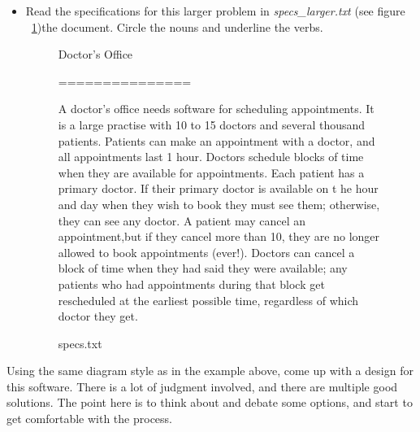 \documentclass[12pt]{article}
\begin{document}
\begin{itemize}
    \item Read the specifications for this larger problem in \textit{specs\_larger.txt}
    (see figure ~\ref{fig:specsText})the document. Circle the nouns and underline
    the verbs.

    \bigskip

    \begin{figure}
        \begin{mdframed}
            Doctor's Office

            ===============

            \bigskip

            A doctor's office needs software for scheduling appointments. It is a large
            practise with 10 to 15 doctors and several thousand patients. Patients
            can make an appointment with a doctor, and all appointments last 1 hour.
            Doctors schedule blocks of time when they are available for appointments.
            Each patient has a primary doctor. If their primary doctor is available on t
            he hour and day when they wish to book they must see them; otherwise, they
            can see any doctor. A patient may cancel an appointment,but if they cancel
            more than 10, they are no longer allowed to book appointments (ever!).
            Doctors can cancel a block of time when they had said they were available;
            any patients who had appointments during that block get rescheduled at the
            earliest possible time, regardless of which doctor they get.
        \end{mdframed}
        \caption{specs.txt}
        \label{fig:specsText}
    \end{figure}
\end{itemize}

\bigskip

Using the same diagram style as in the example above, come up with a design for
this software. There is a lot of judgment involved, and there are multiple good
solutions. The point here is to think about and debate some options, and start to
get comfortable with the process.
\end{document}
